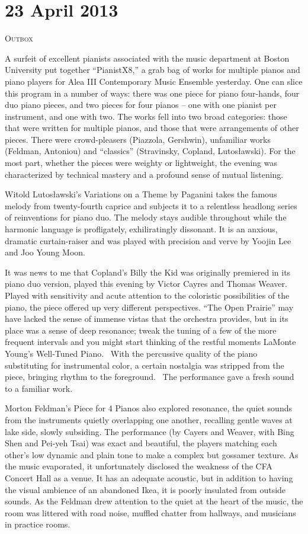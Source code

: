 \chapter{23 April 2013}

\textsc{Outbox}

A surfeit of excellent pianists associated with the music department at Boston University put together “PianistX8,” a grab bag of works for multiple pianos and piano players for Alea III Contemporary Music Ensemble yesterday. One can slice this program in a number of ways: there was one piece for piano four-hands, four duo piano pieces, and two pieces for four pianos – one with one pianist per instrument, and one with two. The works fell into two broad categories: those that were written for multiple pianos, and those that were arrangements of other pieces. There were crowd-pleasers (Piazzola, Gershwin), unfamiliar works (Feldman, Antoniou) and “classics” (Stravinsky, Copland, Lutosławski). For the most part, whether the pieces were weighty or lightweight, the evening was characterized by technical mastery and a profound sense of mutual listening.

Witold Lutosławski’s Variations on a Theme by Paganini takes the famous melody from twenty-fourth caprice and subjects it to a relentless headlong series of reinventions for piano duo. The melody stays audible throughout while the harmonic language is profligately, exhiliratingly dissonant. It is an anxious, dramatic curtain-raiser and was played with precision and verve by Yoojin Lee and Joo Young Moon.

It was news to me that Copland’s Billy the Kid was originally premiered in its piano duo version, played this evening by Victor Cayres and Thomas Weaver.  Played with sensitivity and acute attention to the coloristic possibilities of the piano, the piece offered up very different perspectives. “The Open Prairie” may have lacked the sense of immense vistas that the orchestra provides, but in its place was a sense of deep resonance; tweak the tuning of a few of the more frequent intervals and you might start thinking of the restful moments LaMonte Young’s Well-Tuned Piano.  With the percussive quality of the piano substituting for instrumental color, a certain nostalgia was stripped from the piece, bringing rhythm to the foreground.  The performance gave a fresh sound to a familiar work.

Morton Feldman’s Piece for 4 Pianos also explored resonance, the quiet sounds from the instruments quietly overlapping one another, recalling gentle waves at lake side, slowly subsiding. The performance (by Cayers and Weaver, with Bing Shen and Pei-yeh Tsai) was exact and beautiful, the players matching each other’s low dynamic and plain tone to make a complex but gossamer texture. As the music evaporated, it unfortunately disclosed the weakness of the CFA Concert Hall as a venue. It has an adequate acoustic, but in addition to having the visual ambience of an abandoned Ikea, it is poorly insulated from outside sounds. As the Feldman drew attention to the quiet at the heart of the music, the room was littered with road noise, muffled chatter from hallways, and musicians in practice rooms.

